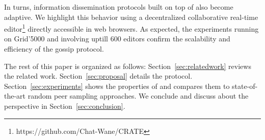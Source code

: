 In turns, information dissemination protocols built on top of \SPRAY also become
adaptive. We highlight this behavior using a decentralized collaborative
real-time editor\footnote{https://github.com/Chat-Wane/CRATE} directly
accessible in web browsers. As expected, the experiments running on Grid'5000
and involving uptill 600 editors confirm the scalability and efficiency of the
gossip protocol.

The rest of this paper is organized as follows: Section~\ref{sec:relatedwork}
reviews the related work. Section~\ref{sec:proposal}
details the \SPRAY protocol. Section~\ref{sec:experiments} shows the properties
of \SPRAY and compares them to state-of-the-art random peer sampling
approaches. We conclude and discuss about the perspective in
Section~\ref{sec:conclusion}.

